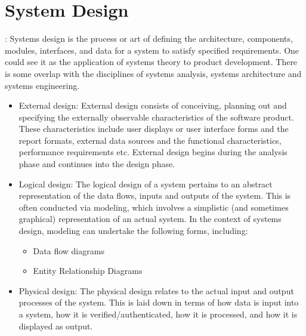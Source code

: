 \section{System Design} : Systems design is the process or art of defining 
the architecture, components, modules, interfaces, and data for a 
system to satisfy specified requirements. One could see it as the 
application of systems theory to product development. There is some 
overlap with the disciplines of systems analysis, systems architecture 
and systems engineering.
\begin{itemize}
\item  External design: External design consists of conceiving, 
planning out and specifying the externally observable characteristics 
of the software product. These characteristics include user displays 
or user interface forms and the report formats, external data sources 
and the functional characteristics, performance requirements etc. 
External design begins during the analysis phase
and continues into the design phase.
\item  Logical design: The logical design of a system pertains to an 
abstract representation of the data flows, inputs and outputs of the 
system. This is often conducted via modeling, which involves a 
simplistic (and sometimes graphical) representation of an actual 
system. In the context of systems design, modeling can undertake the 
following forms, including:
\begin{itemize}
\item Data flow diagrams
\item Entity Relationship Diagrams
\end{itemize}
\item  Physical design: The physical design relates to the actual 
input and output processes of the system. This is laid down in terms 
of how data is input into a system, how it is verified/authenticated, 
how it is processed, and how it is displayed as output.
\end{itemize}
\newpage
